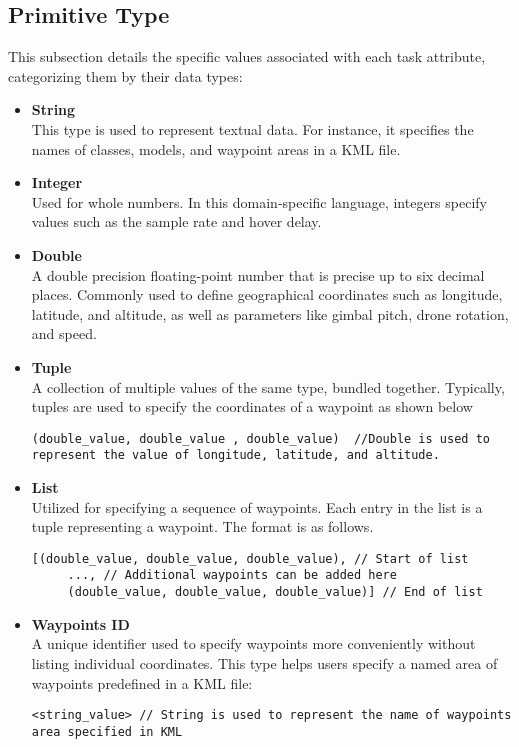 \subsection{Primitive Type}
This subsection details the specific values associated with each task attribute, categorizing them by their data types:
\begin{itemize}
    \item \textbf{String}\\
    This type is used to represent textual data. For instance, it specifies the names of classes, models, and waypoint areas in a KML file.
    \item \textbf{Integer}\\
    Used for whole numbers. In this domain-specific language, integers specify values such as the sample rate and hover delay.
    \item \textbf {Double}\\
    A double precision floating-point number that is precise up to six decimal places. Commonly used to define geographical coordinates such as longitude, latitude, and altitude, as well as parameters like gimbal pitch, drone rotation, and speed.
    \item \textbf{Tuple}\\
    A collection of multiple values of the same type, bundled together. Typically, tuples are used to specify the coordinates of a waypoint as shown below
    \begin{lstlisting}[style=customgo]
    (double_value, double_value , double_value)  //Double is used to represent the value of longitude, latitude, and altitude.
    \end{lstlisting}
    
    \item \textbf{List}\\
    Utilized for specifying a sequence of waypoints. Each entry in the list is a tuple representing a waypoint. The format is as follows.
    \begin{lstlisting}[style=customgo]
    [(double_value, double_value, double_value), // Start of list
     ..., // Additional waypoints can be added here
     (double_value, double_value, double_value)] // End of list
    \end{lstlisting}
    
    \item \textbf{Waypoints ID}\\
    A unique identifier used to specify waypoints more conveniently without listing individual coordinates. This type helps users specify a named area of waypoints predefined in a KML file:
    \begin{lstlisting}[style=customgo]
    <string_value> // String is used to represent the name of waypoints area specified in KML
    \end{lstlisting}
\end{itemize}
    

